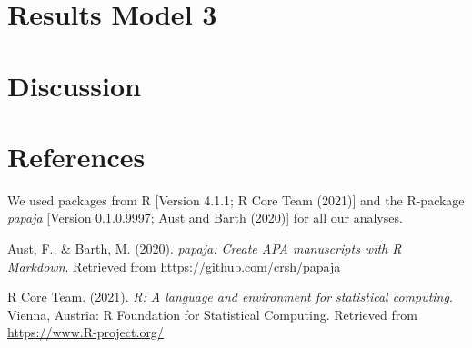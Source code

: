 \documentclass[
  english,
  man]{apa6}
\newlength{\cslhangindent}
\newlength{\cslentryspacingunit} %
\newenvironment{CSLReferences}[2] %
 {%
  \setlength{\parindent}{0pt}
  \ifodd #1
  \let\oldpar\par
  \def\par{\hangindent=\cslhangindent\oldpar}
  \fi
  \setlength{\parskip}{#2\cslentryspacingunit}
 }%
 {}
\begin{document}
\hypertarget{results-model-3}{%
\section{Results Model 3}\label{results-model-3}}

\hypertarget{discussion}{%
\section{Discussion}\label{discussion}}

\newpage

\hypertarget{references}{%
\section{References}\label{references}}

We used packages from R {[}Version 4.1.1; R Core Team (2021){]} and the R-package \emph{papaja} {[}Version 0.1.0.9997; Aust and Barth (2020){]} for all our analyses.

\begingroup
\setlength{\parindent}{-0.5in}
\setlength{\leftskip}{0.5in}

\hypertarget{refs}{}
\begin{CSLReferences}{1}{0}
\leavevmode{}%
Aust, F., \& Barth, M. (2020). \emph{{papaja}: {Create} {APA} manuscripts with {R Markdown}}. Retrieved from \url{https://github.com/crsh/papaja}

\leavevmode{}%
R Core Team. (2021). \emph{R: A language and environment for statistical computing}. Vienna, Austria: R Foundation for Statistical Computing. Retrieved from \url{https://www.R-project.org/}

\end{CSLReferences}

\endgroup
\end{document}
